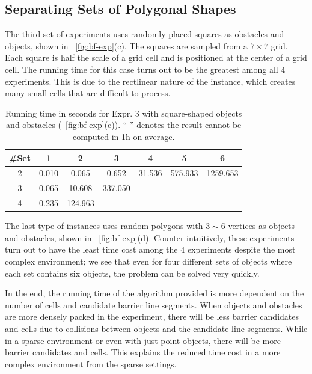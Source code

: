 \subsection{Separating Sets of Polygonal Shapes}
The third set of experiments uses randomly placed squares as obstacles and objects, shown in ~\ref{fig:bf-exp}(c). The squares are sampled from a $7\times7$ grid. Each square is half the scale of a grid cell and is positioned at the center of a grid cell. The running time for this case turns out to be the greatest among all $4$ experiments. This is due to the rectlinear nature of the instance, which creates many small cells that are difficult to process. 

\begin{table}[ht]
    \centering
    \begin{tabular}{|c|c|c|c|c|c|c|}\hline
         \#Set &  1 & 2 & 3 & 4& 5& 6\\\hline
 2 & 0.010 & 0.065 & 0.652 & 31.536 & 575.933 & 1259.653\\\hline
 3 & 0.065 & 10.608 & 337.050 & - & - & -\\\hline
 4 & 0.235 & 124.963 & - & - & - & -\\\hline
    \end{tabular}
    \caption{Running time in seconds for Expr. 3 with square-shaped objects and obstacles (~\ref{fig:bf-exp}(c)). ``-'' denotes the result cannot be computed in 1h on average. 
    }
    \label{tab:bf-expr_3}
    \vspace{-2mm}
\end{table}
 
The last type of instances uses random polygons with $3\sim 6$ vertices
as objects and obstacles, shown in ~\ref{fig:bf-exp}(d). 
Counter intuitively, these experiments turn out to have the least time cost among the $4$ experiments despite the most complex environment; we see that even for four different sets of objects where each set contains six objects, the problem can be solved very quickly. %

In the end, the running time of the algorithm provided is more dependent on the number of cells and candidate barrier line segments. 
When objects and obstacles are more densely packed in the experiment, 
there will be less barrier candidates and cells due to collisions between objects and the candidate line segments.
While in a sparse environment or even with just point objects, there will be more barrier candidates and cells.
This explains the reduced time cost in a more complex environment from the sparse settings.

